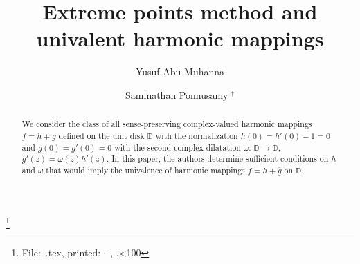 \documentclass[a4paper,12pt]{amsart}
\theoremstyle{definition}
\newcounter{minutes}\setcounter{minutes}{\time}
\newcounter{hours}\setcounter{hours}{\time}
\begin{document}

\title[Extreme points method and univalent harmonic mappings]{Extreme points method and univalent harmonic mappings}

\thanks{
File:~\jobname .tex,
          printed: \number\day-\number\month-\number\year,
          \thehours.\ifnum\theminutes<10{0}\fi\theminutes}

\author[Y. Abu Muhanna]{Yusuf Abu Muhanna}
\address{Y. Abu Muhanna, Department of Mathematics,
American University of Sharjah, UAE-26666.}

\author[S. Ponnusamy]{Saminathan Ponnusamy $^\dagger $
}
\address{S. Ponnusamy,
Indian Statistical Institute (ISI), Chennai Centre, SETS (Society
for Electronic Transactions and security), MGR Knowledge City, CIT
Campus, Taramani, Chennai 600 113, India. }


\begin{abstract}
We consider the class of all sense-preserving complex-valued harmonic mappings $f=h+\overline{g}$
defined on the unit disk ${{\mathbb D}}$ with the normalization $h(0)=h'(0)-1=0$ and $g(0)=g'(0)=0$ with the
second complex dilatation $\omega:\,{{\mathbb D}}\rightarrow {{\mathbb D}}$, $g'(z)=\omega (z)h'(z)$. In this paper, the
authors determine sufficient conditions on $h$ and $\omega$ that would imply the univalence of
harmonic mappings $f=h+\overline{g}$ on ${{\mathbb D}}$.
\end{abstract}

\maketitle \pagestyle{myheadings}
\end{document}
